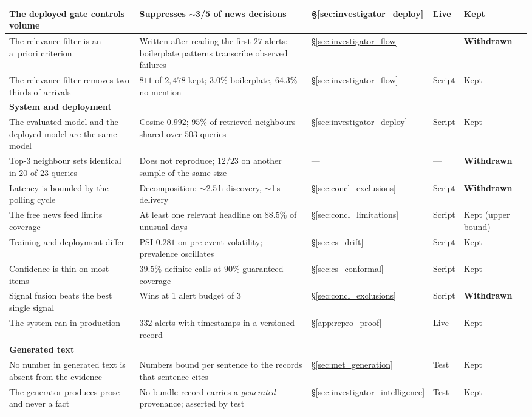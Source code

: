 \begin{table}[ht]
\begin{tabular}{p{4.6cm} p{3.5cm} p{1.6cm} p{1.2cm} p{1.7cm}}
The deployed gate controls volume & Suppresses $\sim$3/5 of news decisions & §\ref{sec:investigator_deploy} & Live & Kept \\
\midrule
The relevance filter is an a~priori criterion & Written after reading the first $27$ alerts; boilerplate patterns transcribe observed failures & §\ref{sec:investigator_flow} & --- & \textbf{Withdrawn} \\
The relevance filter removes two thirds of arrivals & $811$ of $2{,}478$ kept; $3.0\%$ boilerplate, $64.3\%$ no mention & §\ref{sec:investigator_flow} & Script & Kept \\
\midrule
\multicolumn{5}{l}{\textbf{System and deployment}} \\
The evaluated model and the deployed model are the same model & Cosine $0.992$; $95\%$ of retrieved neighbours shared over $503$ queries & §\ref{sec:investigator_deploy} & Script & Kept \\
Top-3 neighbour sets identical in $20$ of $23$ queries & Does not reproduce; $12/23$ on another sample of the same size & --- & --- & \textbf{Withdrawn} \\
Latency is bounded by the polling cycle & Decomposition: $\sim$2.5\,h discovery, $\sim$1\,s delivery & §\ref{sec:concl_exclusions} & Script & \textbf{Withdrawn} \\
The free news feed limits coverage & At least one relevant headline on $88.5\%$ of unusual days & §\ref{sec:concl_limitations} & Script & Kept (upper bound) \\
Training and deployment differ & PSI $0.281$ on pre-event volatility; prevalence oscillates & §\ref{sec:cs_drift} & Script & Kept \\
Confidence is thin on most items & $39.5\%$ definite calls at $90\%$ guaranteed coverage & §\ref{sec:cs_conformal} & Script & Kept \\
Signal fusion beats the best single signal & Wins at 1 alert budget of 3 & §\ref{sec:concl_exclusions} & Script & \textbf{Withdrawn} \\
The system ran in production & $332$ alerts with timestamps in a versioned record & §\ref{app:repro_proof} & Live & Kept \\
\midrule
\multicolumn{5}{l}{\textbf{Generated text}} \\
No number in generated text is absent from the evidence & Numbers bound per sentence to the records that sentence cites & §\ref{sec:met_generation} & Test & Kept \\
The generator produces prose and never a fact & No bundle record carries a \emph{generated} provenance; asserted by test & §\ref{sec:investigator_intelligence} & Test & Kept \\

\end{tabular}
\end{table}

